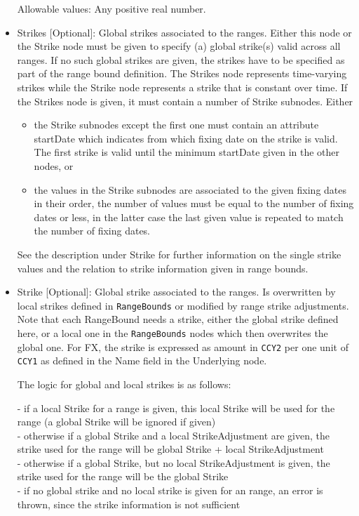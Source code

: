 \begin{itemize}
      Allowable values: Any positive real number.

    \item Strikes [Optional]: Global strikes associated to the ranges. Either this node or the Strike node must be given
      to specify (a) global strike(s) valid across all ranges. If no such global strikes are given, the strikes have to
      be specified as part of the range bound definition.  The Strikes node represents time-varying strikes while the
      Strike node represents a strike that is constant over time. If the Strikes node is given, it must contain a number
      of Strike subnodes. Either
     \begin{itemize}
       \item the Strike subnodes except the first one must contain an attribute startDate which indicates from which
         fixing date on the strike is valid. The first strike is valid until the minimum startDate given in the other
         nodes, or
       \item the values in the Strike subnodes are associated to the given fixing dates in their order, the number of
         values must be equal to the number of fixing dates or less, in the latter case the last given value is repeated
         to match the number of fixing dates.
     \end{itemize}
     See the description under Strike for further information on the single strike values and the relation to strike
     information given in range bounds.

    \item Strike [Optional]: Global strike associated to the ranges. Is overwritten by local strikes defined in
      \lstinline!RangeBounds! or modified by range strike adjustments. Note that each RangeBound needs a strike, either
      the global strike defined here, or a local one in the \lstinline!RangeBounds! nodes which then overwrites the
      global one. For FX, the strike is expressed as amount in \lstinline!CCY2! per one unit of \lstinline!CCY1! as
      defined in the Name field in the Underlying node.
    
The logic for global and local strikes is as follows:

- if a local Strike for a range is given, this local Strike will be used for the range (a global Strike will be ignored if given)\\
- otherwise if a global Strike and a local StrikeAdjustment are given, the strike used for the range will be global Strike + local StrikeAdjustment\\
- otherwise if a global Strike, but no local StrikeAdjustment is given, the strike used for the range will be the global Strike\\
- if no global strike and no local strike is given for an range, an error is thrown, since the strike information is not sufficient
    

\end{itemize}
